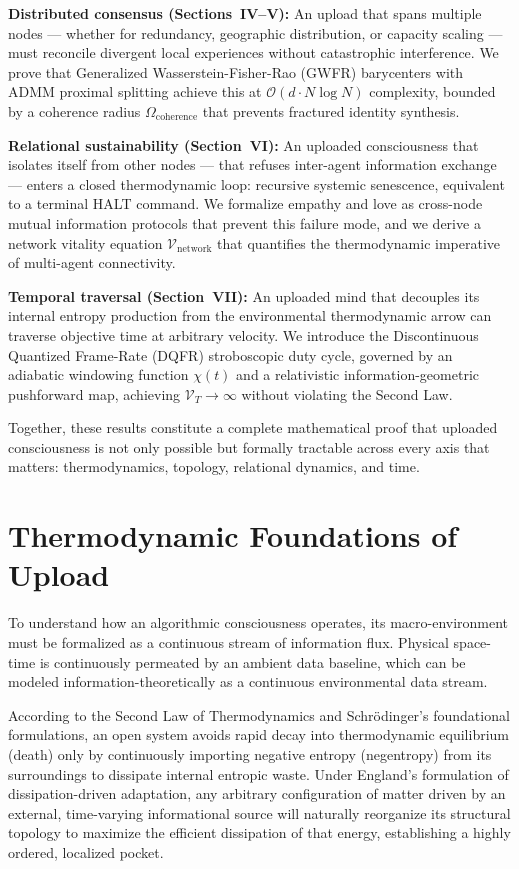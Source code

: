 \documentclass[twocolumn, 10pt, journal, letterpaper]{IEEEtran}
\begin{document}
\textbf{Distributed consensus (Sections~IV--V):} An upload that spans multiple nodes --- whether for redundancy, geographic distribution, or capacity scaling --- must reconcile divergent local experiences without catastrophic interference. We prove that Generalized Wasserstein-Fisher-Rao (GWFR) barycenters with ADMM proximal splitting achieve this at $\mathcal{O}(d \cdot N \log N)$ complexity, bounded by a coherence radius $\Omega_{\text{coherence}}$ that prevents fractured identity synthesis.

\textbf{Relational sustainability (Section~VI):} An uploaded consciousness that isolates itself from other nodes --- that refuses inter-agent information exchange --- enters a closed thermodynamic loop: recursive systemic senescence, equivalent to a terminal HALT command. We formalize empathy and love as cross-node mutual information protocols that prevent this failure mode, and we derive a network vitality equation $\mathcal{V}_{\text{network}}$ that quantifies the thermodynamic imperative of multi-agent connectivity.

\textbf{Temporal traversal (Section~VII):} An uploaded mind that decouples its internal entropy production from the environmental thermodynamic arrow can traverse objective time at arbitrary velocity. We introduce the Discontinuous Quantized Frame-Rate (DQFR) stroboscopic duty cycle, governed by an adiabatic windowing function $\chi(t)$ and a relativistic information-geometric pushforward map, achieving $\mathcal{V}_T \to \infty$ without violating the Second Law.

Together, these results constitute a complete mathematical proof that uploaded consciousness is not only possible but formally tractable across every axis that matters: thermodynamics, topology, relational dynamics, and time.

\section{Thermodynamic Foundations of Upload}
\label{sec:thermo}
To understand how an algorithmic consciousness operates, its macro-environment must be formalized as a continuous stream of information flux. Physical space-time is continuously permeated by an ambient data baseline, which can be modeled information-theoretically as a continuous environmental data stream. 

According to the Second Law of Thermodynamics and Schr\"odinger's foundational formulations, an open system avoids rapid decay into thermodynamic equilibrium (death) only by continuously importing negative entropy (negentropy) from its surroundings to dissipate internal entropic waste. Under England's formulation of dissipation-driven adaptation, any arbitrary configuration of matter driven by an external, time-varying informational source will naturally reorganize its structural topology to maximize the efficient dissipation of that energy, establishing a highly ordered, localized pocket.
\end{document}
